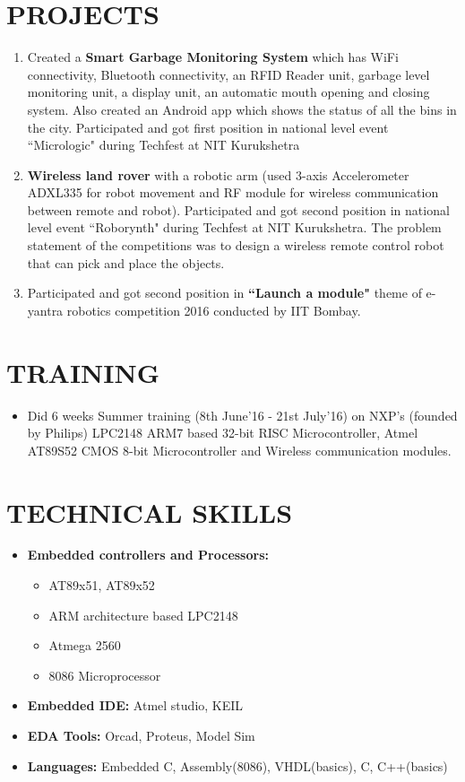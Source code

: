 \documentclass[a4paper]{article}
\begin{document}
\section*{\textbf{PROJECTS}}
\begin{enumerate}
\item Created a \textbf{Smart Garbage Monitoring System} which has WiFi connectivity, Bluetooth connectivity, an RFID Reader unit, garbage level monitoring unit, a display unit, an automatic mouth opening and closing system. Also created an Android app which shows the status of all the bins in the city. Participated and got first position in national level event ``Micrologic" during
Techfest at NIT Kurukshetra
\item \textbf{Wireless land rover} with a robotic arm (used 3-axis Accelerometer ADXL335 for robot movement and RF module for wireless communication between remote and robot). Participated and got second position in  national level event ``Roborynth" during Techfest at NIT Kurukshetra. The problem statement of the competitions was to design a wireless remote control robot that can pick and place the objects.
\item \begin{flushleft} Participated and got second position in \textbf{``Launch a module"} theme of e-yantra robotics competition 2016 conducted by IIT Bombay.\end{flushleft} 
\end{enumerate}

\section*{\textbf{TRAINING}}
\begin{itemize}
\item Did 6 weeks Summer training (8th June'16 - 21st July'16) on NXP's (founded by Philips) LPC2148 ARM7 based 32-bit RISC Microcontroller, Atmel AT89S52 CMOS 8-bit Microcontroller and Wireless communication modules.  
\end{itemize}

\section*{\textbf{TECHNICAL SKILLS}}
\begin{itemize}
\item \textbf{Embedded controllers and Processors:}
   \begin{itemize}
      \item AT89x51, AT89x52
      \item ARM architecture based LPC2148
      \item Atmega 2560
      \item 8086 Microprocessor
   \end{itemize}
\item \textbf{Embedded IDE:} Atmel studio, KEIL 
\item \textbf{EDA Tools:} Orcad, Proteus, Model Sim
\item \textbf{Languages:} Embedded C, Assembly(8086), VHDL(basics), C, C++(basics)
\end{itemize}
\end{document}
